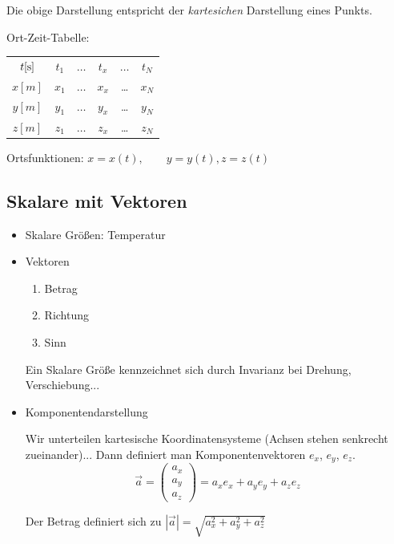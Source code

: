 \documentclass[a4paper,10pt]{scrartcl}
\begin{document}
Die obige Darstellung entspricht der \emph{kartesichen} Darstellung eines Punkts.

Ort-Zeit-Tabelle:
\begin{table}[h]
 \begin{tabular}{c|c|c|c|c|c}
  $t[\text{s}]$ & $ t_1$ & $\ldots$ & $t_x$ & $\ldots$ & $t_N$\\
  $x[m]$ & $x_1$ & $\ldots $ & $x_x$ & \ldots & $x_N$ \\
 $y[m]$ & $y_1$ & $\ldots $ & $y_x$ & \ldots & $y_N$ \\
$z[m]$ & $z_1$ & $\ldots $ & $z_x$ & \ldots & $z_N$ \\ 
 \end{tabular}

\end{table}

Ortsfunktionen: $x=x(t), \qquad y=y(t), z=z(t)$

\subsection{Skalare mit Vektoren}
\begin{itemize}
 \item Skalare Größen: Temperatur
 \item Vektoren
 \begin{enumerate}
  \item Betrag
  \item Richtung
  \item Sinn
 \end{enumerate}

\begin{note}
 Ein Skalare Größe kennzeichnet sich durch Invarianz bei Drehung, Verschiebung...
\end{note}

\item Komponentendarstellung

Wir unterteilen kartesische Koordinatensysteme (Achsen stehen senkrecht zueinander)...  Dann definiert man Komponentenvektoren $e_x$, $e_y$, $e_z$.\\
\[
 \vec a=\begin{pmatrix}a_x\\a_y\\a_z\end{pmatrix}=a_x e_x+a_y e_y+a_z e_z
\]

Der Betrag definiert sich zu $ |\vec a|=\sqrt{a_x^2+a_y^2+a_z^2} $
\end{itemize}
\end{document}
